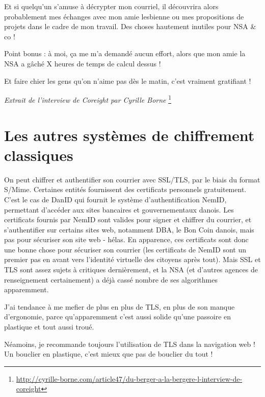 Et si quelqu'un s'amuse à décrypter mon courriel, il découvrira alors
probablement mes échanges avec mon amie lesbienne ou mes propositions de
projets dans le cadre de mon travail. Des choses hautement inutiles pour
NSA \& co !

Point bonus : à moi, ça me m'a demandé aucun effort, alors que mon amie la NSA a gâché X heures de temps de calcul dessus !

\begin{quoting}
Et faire chier les gens qu'on n'aime pas dès le matin, c'est vraiment gratifiant !
\end{quoting}

\emph{Extrait de l'interview de Coreight par Cyrille Borne}
\footnote{\url{http://cyrille-borne.com/article47/du-berger-a-la-bergere-l-interview-de-coreight}}

\section{Les autres systèmes de chiffrement classiques}\label{les-autres-systuxe8mes-de-chiffrement-classiques}

On peut chiffrer et authentifier son courrier avec SSL/TLS, par le biais
du format S/Mime. Certaines entités fournissent des certificats personnels gratuitement. C'est le cas de DanID qui fournit le système d'authentification NemID, permettant d'accéder aux sites bancaires et gouvernementaux danois. Les
certificats fournis par NemID sont valides pour signer et chiffrer du courrier, et s'authentifier sur certains sites web, notamment
DBA, le Bon Coin danois, mais pas pour sécuriser son site web - hélas. En apparence, ces certificats sont donc une bonne chose pour sécuriser son courrier (les certificats de NemID sont un premier pas en avant vers
l'identité virtuelle des citoyens après tout). Mais SSL et TLS sont assez sujets à critiques dernièrement, et la NSA (et d'autres agences de
renseignement certainement) a déjà cassé nombre de ses algorithmes apparemment.

J'ai tendance à me mefier de plus en plus de TLS, en plus de son manque
d'ergonomie, parce qu'apparemment c'est aussi solide qu'une passoire en
plastique et tout aussi troué.

\begin{notice}
	Néamoins, je recommande toujours l'utilisation de TLS dans la navigation web ! Un bouclier en plastique, c'est mieux que pas de bouclier du tout !
\end{notice}

